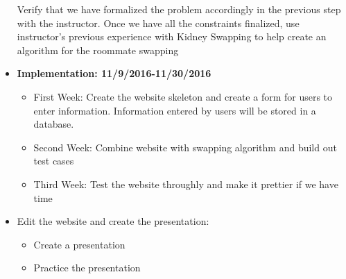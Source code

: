 \documentclass[12pt]{article}
\begin{document}
\begin{itemize}
Verify that we have formalized the problem accordingly in the previous step with the instructor. Once we have all the constraints finalized, use instructor's previous experience with Kidney Swapping to help create an algorithm for the roommate swapping
\item \textbf{Implementation: 11/9/2016-11/30/2016} 
\begin{itemize}
\item First Week: Create the website skeleton and create a form for users to enter information. Information entered by users will be stored in a database. 
\item Second Week: Combine website with swapping algorithm and build out test cases
\item Third Week: Test the website throughly and make it prettier if we have time
\end{itemize}
\item Edit the website and create the presentation: 
\begin{itemize} 
\item Create a presentation
\item Practice the presentation
\end{itemize}

\end{itemize}


%







\end{document}
